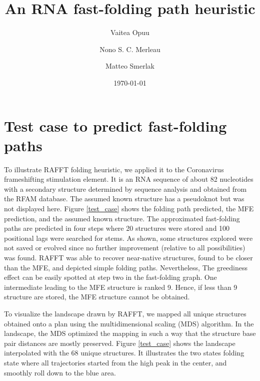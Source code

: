 \documentclass[a4paper,12pt]{article}
\author[]{Vaitea Opuu}
\author[]{Nono S. C. Merleau}
\author[]{Matteo Smerlak}
\affil[]{Max Planck Institute for Mathematics in the Sciences, Leipzig, Germany}
\date{\today}
\title{An RNA fast-folding path heuristic}
\begin{document}
\maketitle
\section*{Test case to predict fast-folding paths}
\label{sec:orge084e30}
To illustrate RAFFT folding heuristic, we applied it to the Coronavirus
frameshifting stimulation element. It is an RNA sequence of about 82 nucleotides
with a secondary structure determined by sequence analysis and obtained from the
RFAM database. The assumed known structure has a pseudoknot but was not
displayed here. Figure \ref{test_case} shows the folding path predicted, the MFE
prediction, and the assumed known structure. The approximated fast-folding paths
are predicted in four steps where 20 structures were stored and 100 positional
lags were searched for stems. As shown, some structures explored were not saved
or evolved since no further improvement (relative to all possibilities) was
found. RAFFT was able to recover near-native structures, found to be closer than
the MFE, and depicted simple folding paths. Nevertheless, The greediness effect
can be easily spotted at step two in the fast-folding graph. One intermediate
leading to the MFE structure is ranked 9. Hence, if less than 9 structure are
stored, the MFE structure cannot be obtained.

To visualize the landscape drawn by RAFFT, we mapped all unique structures
obtained onto a plan using the multidimensional scaling (MDS) algorithm. In the
landscape, the MDS optimized the mapping in such a way that the structure base
pair distances are mostly preserved. Figure \ref{test_case} shows the landscape
interpolated with the 68 unique structures. It illustrates the two states
folding state where all trajectories started from the high peak in the center,
and smoothly roll down to the blue area.
\end{document}
